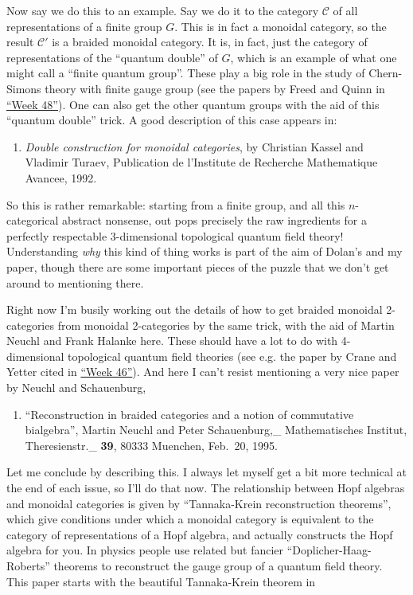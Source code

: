 \documentclass{article}
\def\tightlist{}
\begin{document}
Now say we do this to an example. Say we do it to the category
\(\mathcal{C}\) of all representations of a finite group \(G\). This is
in fact a monoidal category, so the result \(\mathcal{C}'\) is a braided
monoidal category. It is, in fact, just the category of representations
of the ``quantum double'' of \(G\), which is an example of what one
might call a ``finite quantum group''. These play a big role in the
study of Chern-Simons theory with finite gauge group (see the papers by
Freed and Quinn in \protect\hyperlink{week48}{``Week 48''}). One can
also get the other quantum groups with the aid of this ``quantum
double'' trick. A good description of this case appears in:

\begin{enumerate}
\def\labelenumi{\arabic{enumi})}
\setcounter{enumi}{2}
\tightlist
\item
  \emph{Double construction for monoidal categories}, by Christian
  Kassel and Vladimir Turaev, Publication de l'Institute de Recherche
  Mathematique Avancee, 1992.
\end{enumerate}

So this is rather remarkable: starting from a finite group, and all this
\(n\)-categorical abstract nonsense, out pops precisely the raw
ingredients for a perfectly respectable 3-dimensional topological
quantum field theory! Understanding \emph{why} this kind of thing works
is part of the aim of Dolan's and my paper, though there are some
important pieces of the puzzle that we don't get around to mentioning
there.

Right now I'm busily working out the details of how to get braided
monoidal 2-categories from monoidal 2-categories by the same trick, with
the aid of Martin Neuchl and Frank Halanke here. These should have a lot
to do with 4-dimensional topological quantum field theories (see e.g.
the paper by Crane and Yetter cited in \protect\hyperlink{week46}{``Week
46''}). And here I can't resist mentioning a very nice paper by Neuchl
and Schauenburg,

\begin{enumerate}
\def\labelenumi{\arabic{enumi})}
\setcounter{enumi}{3}
\tightlist
\item
  ``Reconstruction in braided categories and a notion of commutative
  bialgebra'', Martin Neuchl and Peter Schauenburg,\_ Mathematisches
  Institut, Theresienstr.\_ \textbf{39}, 80333 Muenchen, Feb.~20, 1995.
\end{enumerate}

Let me conclude by describing this. I always let myself get a bit more
technical at the end of each issue, so I'll do that now. The
relationship between Hopf algebras and monoidal categories is given by
``Tannaka-Krein reconstruction theorems'', which give conditions under
which a monoidal category is equivalent to the category of
representations of a Hopf algebra, and actually constructs the Hopf
algebra for you. In physics people use related but fancier
``Doplicher-Haag-Roberts'' theorems to reconstruct the gauge group of a
quantum field theory. This paper starts with the beautiful Tannaka-Krein
theorem in
\end{document}
